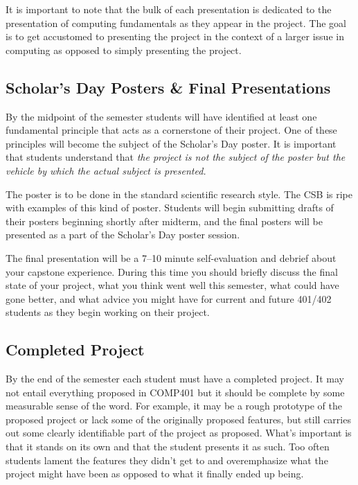 \documentclass[]{article}
\begin{document}
It is important to note that the bulk of each presentation is dedicated to the presentation of computing fundamentals as they appear in the project. The goal is to get accustomed to presenting the project in the context of a larger issue in computing as opposed to simply presenting the project.

\subsection{Scholar's Day Posters \& Final Presentations}

By the midpoint of the semester students will have identified at least one fundamental principle that acts as a cornerstone of their project. One of these principles will become the subject of the Scholar's Day poster.  It is important that students understand that \textit{the project is not the subject of the poster but the vehicle by which the actual subject is presented.}

The poster is to be done in the standard scientific research style. The CSB is ripe with examples of this kind of poster. Students will begin submitting drafts of their posters beginning shortly after midterm, and the final posters will be presented as a part of the Scholar's Day poster session.

The final presentation will be a 7--10 minute self-evaluation and debrief about your capstone experience. During this time you should briefly discuss the final state of your project, what you think went well this semester, what could have gone better, and what advice you might have for current and future 401/402 students as they begin working on their project.

\subsection{Completed Project}

By the end of the semester each student must have a completed project. It may not entail everything proposed in COMP401 but it should be complete by some measurable sense of the word. For example, it may be a rough prototype of the proposed project or lack some of the originally proposed features, but still carries out some clearly identifiable part of the project as proposed. What's important is that it stands on its own and that the student presents it as such. Too often students lament the features they didn't get to and overemphasize what the project might have been as opposed to what it finally ended up being.
\end{document}
